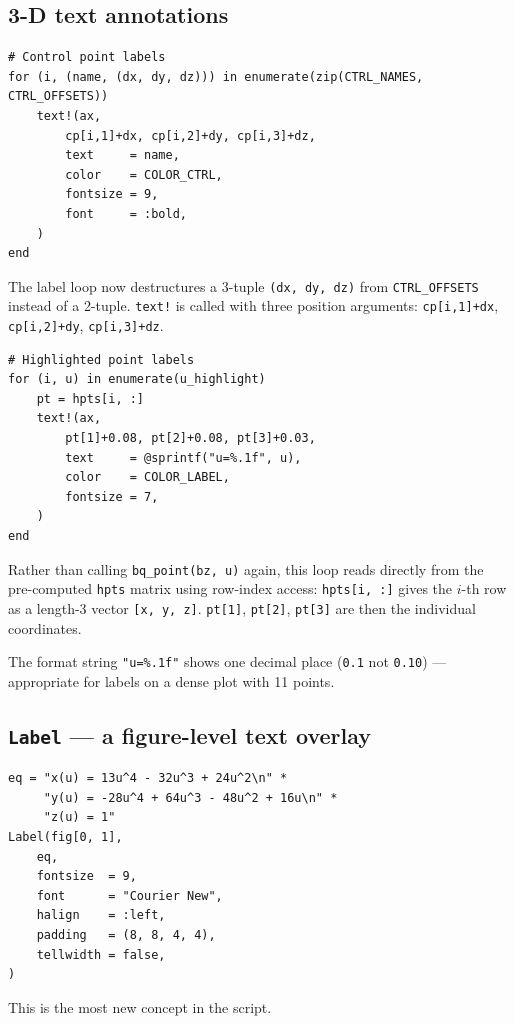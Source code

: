 \documentclass[12pt, a4paper]{article}
\newcommand{\cd}[1]{\texttt{#1}}
\begin{document}
\subsection{3-D text annotations}

\begin{verbatim}
# Control point labels
for (i, (name, (dx, dy, dz))) in enumerate(zip(CTRL_NAMES, CTRL_OFFSETS))
    text!(ax,
        cp[i,1]+dx, cp[i,2]+dy, cp[i,3]+dz,
        text     = name,
        color    = COLOR_CTRL,
        fontsize = 9,
        font     = :bold,
    )
end
\end{verbatim}

The label loop now destructures a 3-tuple \cd{(dx, dy, dz)}
from \cd{CTRL\_OFFSETS} instead of a 2-tuple.
\cd{text!} is called with three position arguments:
\cd{cp[i,1]+dx}, \cd{cp[i,2]+dy}, \cd{cp[i,3]+dz}.

\begin{verbatim}
# Highlighted point labels
for (i, u) in enumerate(u_highlight)
    pt = hpts[i, :]
    text!(ax,
        pt[1]+0.08, pt[2]+0.08, pt[3]+0.03,
        text     = @sprintf("u=%.1f", u),
        color    = COLOR_LABEL,
        fontsize = 7,
    )
end
\end{verbatim}

Rather than calling \cd{bq\_point(bz, u)} again,
this loop reads directly from the pre-computed \cd{hpts}
matrix using row-index access: \cd{hpts[i, :]} gives
the $i$-th row as a length-3 vector \cd{[x, y, z]}.
\cd{pt[1]}, \cd{pt[2]}, \cd{pt[3]} are then the
individual coordinates.

The format string \cd{"u=\%.1f"} shows one decimal place
(\cd{0.1} not \cd{0.10}) --- appropriate for labels on
a dense plot with 11 points.

\subsection{\texttt{Label} --- a figure-level text overlay}

\begin{verbatim}
eq = "x(u) = 13u^4 - 32u^3 + 24u^2\n" *
     "y(u) = -28u^4 + 64u^3 - 48u^2 + 16u\n" *
     "z(u) = 1"
Label(fig[0, 1],
    eq,
    fontsize  = 9,
    font      = "Courier New",
    halign    = :left,
    padding   = (8, 8, 4, 4),
    tellwidth = false,
)
\end{verbatim}

This is the most new concept in the script.
\end{document}
